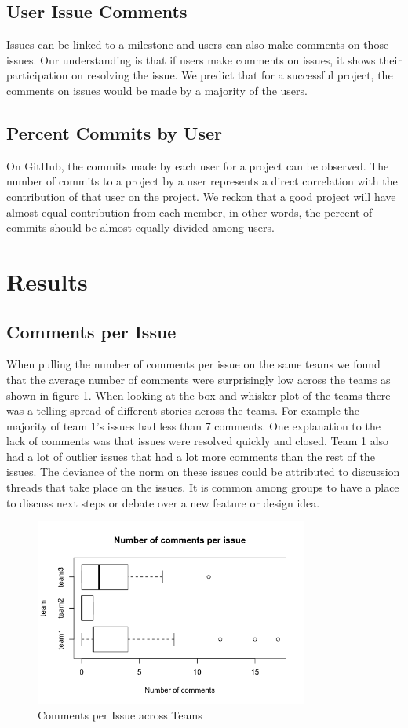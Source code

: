 \documentclass[conference]{IEEEtran}
\begin{document}
\subsection{User Issue Comments}
Issues can be linked to a milestone and users can also make comments on those issues. Our understanding is that if users make comments on issues, it shows their participation on resolving the issue. We predict that for a successful project, the comments on issues would be made by a majority of the users.

\subsection{Percent Commits by User}
On GitHub, the commits made by each user for a project can be observed. The number of commits to a project by a user represents a direct correlation with the contribution of that user on the project. We reckon that a good project will have almost equal contribution from each member, in other words, the percent of commits should be almost equally divided among users.

\section{Results}
\subsection{Comments per Issue}
When pulling the number of comments per issue on the same teams we found that the average number of comments were surprisingly low across the teams as shown in figure \ref{comments_issue}. When looking at the box and whisker plot of the teams there was a telling spread of different stories across the teams. For example the majority of team 1's issues had less than 7 comments. One explanation to the lack of comments was that issues were resolved quickly and closed. Team 1 also had a lot of outlier issues that had a lot more comments than the rest of the issues. The deviance of the norm on these issues could be attributed to discussion threads that take place on the issues. It is common among groups to have a place to discuss next steps or debate over a new feature or design idea.

\begin{figure}[H]
    \centering
    \includegraphics[width=9cm]{../AprilProject/pic/comments_per_issue.png}
    \caption{Comments per Issue across Teams}
    \label{comments_issue}
\end{figure}
\end{document}
